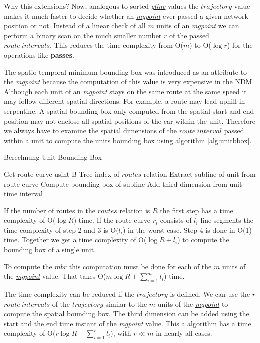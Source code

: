 \documentclass[a4paper]{article}
\newcommand{\op}[1]{\textbf{#1}}
\newcommand{\dt}[1]{\textsl{\underline{#1}}}
\begin{document}
Why this extensions?
Now, analogous to sorted \dt{gline} values the $trajectory$ value makes it much
faster to decide whether an \dt{mgpoint} ever passed a given network position or
not. Instead of a linear check of all $m$ units of an \dt{mgpoint} we can perform
a binary scan on the much smaller number $r$ of the passed $route\ intervals$.
This reduces the time complexity from O($m$) to O($\log r$) for the operations
like \op{passes}.

The spatio-temporal minimum bounding box was introduced as an attribute to the
\dt{mgpoint} because the computation of this value is very expensive in the
NDM. Although each unit of an \dt{mgpoint} stays on the same route
at the same speed it may follow different spatial directions. For example, a
route may lead uphill in serpentine. A spatial bounding box only computed from
the spatial start and end position may not enclose all spatial positions of the
car within the unit. Therefore we always have to examine the spatial dimensions
of the $route\ interval$ passed within a unit to compute the units bounding box
using algorithm \ref{alg:unitbbox}.
\begin{algorithm}[H]
  \caption{Berechnung Unit Bounding Box}
  \label{alg:unitbbox}
  \begin{algorithmic}[1]
    \STATE Get route curve usint B-Tree index of $routes$ relation
    \STATE Extract subline of unit from route curve
    \STATE Compute bounding box of subline
    \STATE Add third dimension from unit time interval
  \end{algorithmic}
\end{algorithm}
If the number of routes in the $routes$ relation is $R$ the first step has a
time complexity of O($\log R$) time. If the route curve $r_i$ consists of $l_i$
line segments the time complexity of step 2 and 3 is O($l_i$) in the worst case.
Step 4 is done in O(1) time. Together we get a time complexity of
O($\log {R} + l_i$) to compute the bounding box of a single unit.

To compute the $mbr$ this computation must be done for each of the $m$ units of
the \dt{mgpoint} value. That takes O($m \log {R} + \sum_{i=1}^{m}{l_i}$) time.

The time complexity can be reduced if the $trajectory$ is defined. We can use
the $r$ $route\ intervals$ of the $trajectory$ similar to the $m$ units of
the \dt{mgpoint} to compute the spatial bounding box. The third dimension can be
added using the start and the end time instant of the \dt{mgpoint} value. This a
algorithm has a time complexity of O($r \log {R} + \sum_{i=1}^{r}{l_i}$), with
$r \ll m$ in nearly all cases.
\end{document}
